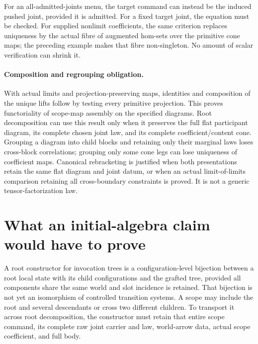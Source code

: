 \documentclass[11pt]{article}
\begin{document}
For an all-admitted-joints menu, the target command can instead be the induced pushed joint, provided it is admitted. For a fixed target joint, the equation must be checked. For supplied nonlimit coefficients, the same criterion replaces uniqueness by the actual fibre of augmented hom-sets over the primitive cone maps; the preceding example makes that fibre non-singleton. No amount of scalar verification can shrink it.

\paragraph{Composition and regrouping obligation.}
With actual limits and projection-preserving maps, identities and composition of the unique lifts follow by testing every primitive projection. This proves functoriality of scope-map assembly on the specified diagrams. Root decomposition can use this result only when it preserves the full flat participant diagram, its complete chosen joint law, and its complete coefficient/content cone. Grouping a diagram into child blocks and retaining only their marginal laws loses cross-block correlations; grouping only some cone legs can lose uniqueness of coefficient maps. Canonical rebracketing is justified when both presentations retain the same flat diagram and joint datum, or when an actual limit-of-limits comparison retaining all cross-boundary constraints is proved. It is not a generic tensor-factorization law.

\section{What an initial-algebra claim would have to prove}
A root constructor for invocation trees is a configuration-level bijection between a root local state with its child configurations and the grafted tree, provided all components share the same world and slot incidence is retained. That bijection is not yet an isomorphism of controlled transition systems. A scope may include the root and several descendants or cross two different children. To transport it across root decomposition, the constructor must retain that entire scope command, its complete raw joint carrier and law, world-arrow data, actual scope coefficient, and full body.
\end{document}

